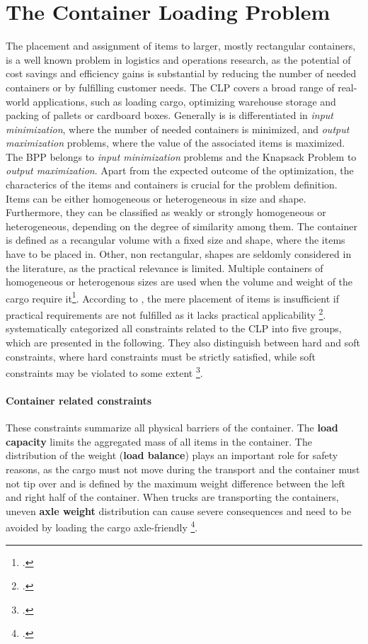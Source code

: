\chapter{The Container Loading Problem}
\label{sec:clp_definition}

The placement and assignment of items to larger, mostly rectangular
containers, is a well known problem in logistics and operations research, as the
potential of cost savings and efficiency gains is substantial by reducing the number
of needed containers or by fulfilling customer needs. The \gls{CLP} covers a broad range of real-world applications,
such as loading cargo, optimizing warehouse storage and packing of pallets or cardboard boxes.
Generally is is differentiated in \textit{input minimization},
where the number of needed containers is minimized, and \textit{output maximization} problems,
where the value of the associated items is maximized. The \gls{BPP} belongs to \textit{input minimization} problems
and the Knapsack Problem to \textit{output maximization}. Apart from the expected outcome of the optimization,
the characterics of the items and containers is crucial for the problem definition. Items can be either
homogeneous or heterogeneous in size and shape. Furthermore, they can be classified as weakly or strongly
homogeneous or heterogeneous, depending on the degree of similarity among them. The container is
defined as a recangular volume with a fixed size and shape, where the items have to be placed in.
Other, non rectangular, shapes are seldomly considered in the literature, as the practical relevance is
limited. Multiple containers of homogeneous or heterogenous sizes are used when the volume and weight
of the cargo require it\footcite[cf.][pp.1--2]{bortfeldt_constraints_2013}.
According to \citeauthor*{bischoff_issues_1995}, the mere placement of items is insufficient
if practical requirements are not fulfilled as it lacks practical applicability \footcite[cf.][pp.1--2]{bischoff_issues_1995}.
\citeauthor*{bortfeldt_constraints_2013} systematically categorized all constraints related
to the \gls{CLP} into five groups, which are presented in the following. They also distinguish between hard and soft constraints,
where hard constraints must be strictly satisfied, while soft constraints may be violated
to some extent \footcite[cf.][p.2]{bortfeldt_constraints_2013}.

\subsubsection{Container related constraints}
These constraints summarize all physical barriers of the container. The \textbf{load capacity} limits the aggregated
mass of all items in the container. The distribution of the weight (\textbf{load balance})
plays an important role for safety reasons, as the cargo must not move during the transport and the container
must not tip over and is defined by the maximum weight difference between the left and right half of the container.
When trucks are transporting the containers, uneven \textbf{axle weight} distribution can cause severe
consequences and need to be avoided by loading the cargo axle-friendly \footcite[cf.][pp. 849--850]{krebs_advanced_2021}.

